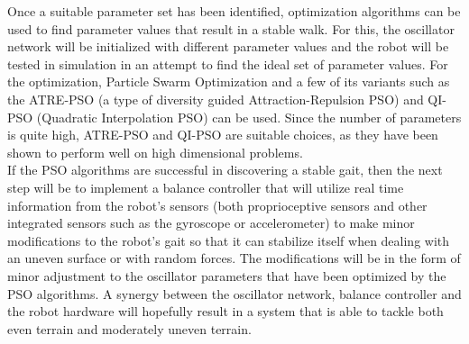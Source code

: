 \documentclass[12pt,twoside]{article}
\theoremstyle{plain}
\theoremstyle{definition}
\theoremstyle{remark}
\newcommand{\forceindent}{\leavevmode{\parindent=2em\indent}}
\begin{document}
\forceindent Once a suitable parameter set has been identified, optimization algorithms can be used to find parameter values that result in a stable walk. For this, the oscillator network will be initialized with different parameter values and the robot will be tested in simulation in an attempt to find the ideal set of parameter values. For the optimization, Particle Swarm Optimization \cite{Eberhart1995, Shi1998, Kennedy2002} and a few of its variants such as the ATRE-PSO (a type of diversity guided Attraction-Repulsion PSO) \cite{Pant2007a} and QI-PSO (Quadratic Interpolation PSO) \cite{Pant2007} can be used. Since the number of parameters is quite high, ATRE-PSO and QI-PSO are suitable choices, as they have been shown to perform well on high dimensional problems.\\
\forceindent If the PSO algorithms are successful in discovering a stable gait, then the next step will be to implement a balance controller that will utilize real time information from the robot's sensors (both proprioceptive sensors and other integrated sensors such as the gyroscope or accelerometer) to make minor modifications to the robot's gait so that it can stabilize itself when dealing with an uneven surface or with random forces. The modifications will be in the form of minor adjustment to the oscillator parameters that have been optimized by the PSO algorithms. A synergy between the oscillator network, balance controller and the robot hardware will hopefully result in a system that is able to tackle both even terrain and moderately uneven terrain. 



%
%


\end{document}
